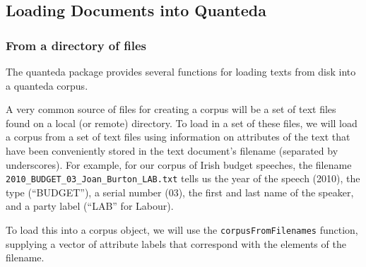\documentclass[11pt]{article}
\begin{document}
\subsection{Loading Documents into Quanteda}

\subsubsection{From a directory of files}

The quanteda package provides several functions for loading texts from disk into a quanteda corpus.

A very common source of files for creating a corpus will be a set of
text files found on a local (or remote) directory.  To load in a set
of these files, we will load a corpus from a set of text files using
information on attributes of the text that have been conveniently
stored in the text document's filename (separated by underscores).
For example, for our corpus of Irish budget speeches, the filename
\texttt{2010\_BUDGET\_03\_Joan\_Burton\_LAB.txt} tells us the year of
the speech (2010), the type (``BUDGET''), a serial number (03), the
first and last name of the speaker, and a party label (``LAB'' for
Labour).

To load this into a corpus object, we will use the
\texttt{corpusFromFilenames} function, supplying a vector of attribute
labels that correspond with the elements of the filename.
\end{document}
